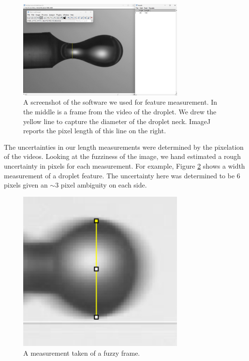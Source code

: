 \documentclass[12pt, letterpaper]{article}
\begin{document}
\begin{figure}[!h]
    \centering
    \includegraphics[width=0.75\textwidth]{experiment3/figures/screenshots/measurement3.png}
    \caption{A screenshot of the software we used for feature measurement. In the middle is a frame from the video of the droplet. We drew the yellow line to capture the diameter of the droplet neck. ImageJ reports the pixel length of this line on the right. }
    \label{fig:measurement3}
\end{figure}

The uncertainties in our length measurements were determined by the pixelation of the videos. Looking at the fuzziness of the image, we hand estimated a rough uncertainty in pixels for each measurement. For example, Figure \ref{fig:measurement2-zoom} shows a width measurement of a droplet feature. The uncertainty here was determined to be $6$ pixels given an $\sim 3$ pixel ambiguity on each side. 

\begin{figure}[!h]
    \centering
    \includegraphics[width=0.75\textwidth]{experiment3/figures/screenshots/measurement2-zoom.png}
    \caption{A measurement taken of a fuzzy frame. }
    \label{fig:measurement2-zoom}
\end{figure}
\end{document}
